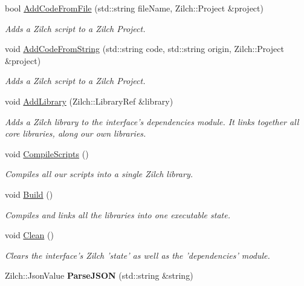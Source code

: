 \begin{DoxyCompactItemize}
\item 
bool \hyperlink{classDCEngine_1_1Systems_1_1ZilchInterface_ab709e035827ec5b8c9bdfbefb929b7c9}{Add\-Code\-From\-File} (std\-::string file\-Name, Zilch\-::\-Project \&project)
\begin{DoxyCompactList}\small\item\em Adds a Zilch script to a Zilch Project. \end{DoxyCompactList}\item 
void \hyperlink{classDCEngine_1_1Systems_1_1ZilchInterface_ae8560eb639946d466c360ca2b431aa85}{Add\-Code\-From\-String} (std\-::string code, std\-::string origin, Zilch\-::\-Project \&project)
\begin{DoxyCompactList}\small\item\em Adds a Zilch script to a Zilch Project. \end{DoxyCompactList}\item 
void \hyperlink{classDCEngine_1_1Systems_1_1ZilchInterface_a540669ec1c67f6b1dc58549ae98c9b3d}{Add\-Library} (Zilch\-::\-Library\-Ref \&library)
\begin{DoxyCompactList}\small\item\em Adds a Zilch library to the interface's dependencies module. It links together all core libraries, along our own libraries. \end{DoxyCompactList}\item 
void \hyperlink{classDCEngine_1_1Systems_1_1ZilchInterface_a51bcecc50c205bc30e1bf25ba297b994}{Compile\-Scripts} ()
\begin{DoxyCompactList}\small\item\em Compiles all our scripts into a single Zilch library. \end{DoxyCompactList}\item 
void \hyperlink{classDCEngine_1_1Systems_1_1ZilchInterface_adec2c50d02ca2fd24d9d37b20abc0d95}{Build} ()
\begin{DoxyCompactList}\small\item\em Compiles and links all the libraries into one executable state. \end{DoxyCompactList}\item 
\hypertarget{classDCEngine_1_1Systems_1_1ZilchInterface_a11626a4d551335ebf5152b68c512b848}{void \hyperlink{classDCEngine_1_1Systems_1_1ZilchInterface_a11626a4d551335ebf5152b68c512b848}{Clean} ()}\label{classDCEngine_1_1Systems_1_1ZilchInterface_a11626a4d551335ebf5152b68c512b848}

\begin{DoxyCompactList}\small\item\em Clears the interface's Zilch 'state' as well as the 'dependencies' module. \end{DoxyCompactList}\item 
\hypertarget{classDCEngine_1_1Systems_1_1ZilchInterface_a7db5f3f72aee9143d62284b4244b9c1b}{Zilch\-::\-Json\-Value {\bfseries Parse\-J\-S\-O\-N} (std\-::string \&string)}\label{classDCEngine_1_1Systems_1_1ZilchInterface_a7db5f3f72aee9143d62284b4244b9c1b}


\end{DoxyCompactItemize}
